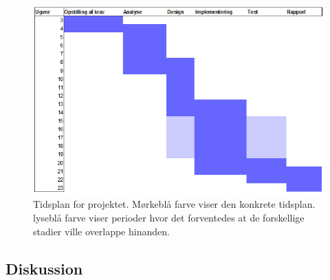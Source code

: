 \documentclass[rapport.tex]{subfiles}
\begin{document}
	\begin{figure}
	\centering
	\includegraphics[width=1\linewidth]{Tidsplan}
	\caption{Tidsplan for projektet. Mørkeblå farve viser den konkrete tidsplan. lyseblå farve viser perioder hvor det forventedes at de forskellige stadier ville overlappe hinanden.}
	\label{fig:Tidsplan}
	\end{figure}
	
	\subsection{Diskussion}
	
		
\end{document}

